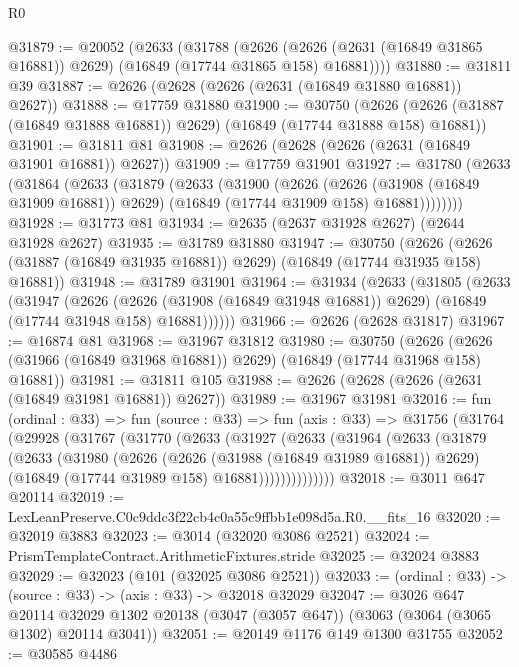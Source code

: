 \begin{lexlean}{R0}
\begin{coremodule}
@31879 := @20052
    (@2633
      (@31788
        (@2626 (@2626 (@2631 (@16849 @31865 @16881)) @2629) (@16849 (@17744 @31865 @158) @16881))))
@31880 := @31811 @39
@31887 := @2626 (@2628 (@2626 (@2631 (@16849 @31880 @16881)) @2627))
@31888 := @17759 @31880
@31900 := @30750
    (@2626 (@2626 (@31887 (@16849 @31888 @16881)) @2629) (@16849 (@17744 @31888 @158) @16881))
@31901 := @31811 @81
@31908 := @2626 (@2628 (@2626 (@2631 (@16849 @31901 @16881)) @2627))
@31909 := @17759 @31901
@31927 := @31780
    (@2633
      (@31864
        (@2633
          (@31879
            (@2633
              (@31900
                (@2626
                  (@2626 (@31908 (@16849 @31909 @16881)) @2629)
                  (@16849 (@17744 @31909 @158) @16881))))))))
@31928 := @31773 @81
@31934 := @2635 (@2637 @31928 @2627) (@2644 @31928 @2627)
@31935 := @31789 @31880
@31947 := @30750
    (@2626 (@2626 (@31887 (@16849 @31935 @16881)) @2629) (@16849 (@17744 @31935 @158) @16881))
@31948 := @31789 @31901
@31964 := @31934
    (@2633
      (@31805
        (@2633
          (@31947
            (@2626
              (@2626 (@31908 (@16849 @31948 @16881)) @2629)
              (@16849 (@17744 @31948 @158) @16881))))))
@31966 := @2626 (@2628 @31817)
@31967 := @16874 @81
@31968 := @31967 @31812
@31980 := @30750
    (@2626 (@2626 (@31966 (@16849 @31968 @16881)) @2629) (@16849 (@17744 @31968 @158) @16881))
@31981 := @31811 @105
@31988 := @2626 (@2628 (@2626 (@2631 (@16849 @31981 @16881)) @2627))
@31989 := @31967 @31981
@32016 := fun (ordinal : @33) =>
  fun (source : @33) =>
  fun (axis : @33) =>
  @31756
    (@31764
      (@29928
        (@31767
          (@31770
            (@2633
              (@31927
                (@2633
                  (@31964
                    (@2633
                      (@31879
                        (@2633
                          (@31980
                            (@2626
                              (@2626 (@31988 (@16849 @31989 @16881)) @2629)
                              (@16849 (@17744 @31989 @158) @16881))))))))))))))
@32018 := @3011 @647 @20114
@32019 := LexLeanPreserve.C0c9ddc3f22cb4c0a55c9ffbb1e098d5a.R0.__fits_16
@32020 := @32019 @3883
@32023 := @3014 (@32020 @3086 @2521)
@32024 := PrismTemplateContract.ArithmeticFixtures.stride
@32025 := @32024 @3883
@32029 := @32023 (@101 (@32025 @3086 @2521))
@32033 := (ordinal : @33) -> (source : @33) -> (axis : @33) -> @32018 @32029
@32047 := @3026
    @647
    @20114
    @32029
    @1302
    @20138
    (@3047 (@3057 @647))
    (@3063 (@3064 (@3065 @1302) @20114 @3041))
@32051 := @20149 @1176 @149 @1300 @31755
@32052 := @30585 @4486

\end{coremodule}
\end{lexlean}
